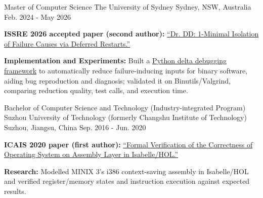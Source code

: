 

\begin{cventries}

  \cventry
    {Master of Computer Science} %
    {The University of Sydney} %
    {Sydney, NSW, Australia} %
    {Feb. 2024 - May 2026} %
    {
      \begin{cvitems} %
        \item {\textbf{ISSRE 2026 accepted paper (second author):} \href{https://rahul.gopinath.org/publications/2026/07/11/drdd/}{``Dr. DD: 1-Minimal Isolation of Failure Causes via Deferred Restarts.''}}
        \item {\textbf{Implementation and Experiments:} Built a \href{https://github.com/FreeFlyingSheep/delta-debugging}{Python delta debugging framework} to automatically reduce failure-inducing inputs for binary software, aiding bug reproduction and diagnosis; validated it on Binutils/Valgrind, comparing reduction quality, test calls, and execution time.}
      \end{cvitems}
    }

  \cventry
    {Bachelor of Computer Science and Technology (Industry-integrated Program)} %
    {Suzhou University of Technology (formerly Changshu Institute of Technology)} %
    {Suzhou, Jiangsu, China} %
    {Sep. 2016 - Jun. 2020} %
    {
      \begin{cvitems} %
        \item {\textbf{ICAIS 2020 paper (first author):} \href{https://doi.org/10.1007/978-981-15-8083-3_25}{``Formal Verification of the Correctness of Operating System on Assembly Layer in Isabelle/HOL.''}}
        \item {\textbf{Research:} Modelled MINIX 3's i386 context-saving assembly in Isabelle/HOL and verified register/memory states and instruction execution against expected results.}
      \end{cvitems}
    }

\end{cventries}
